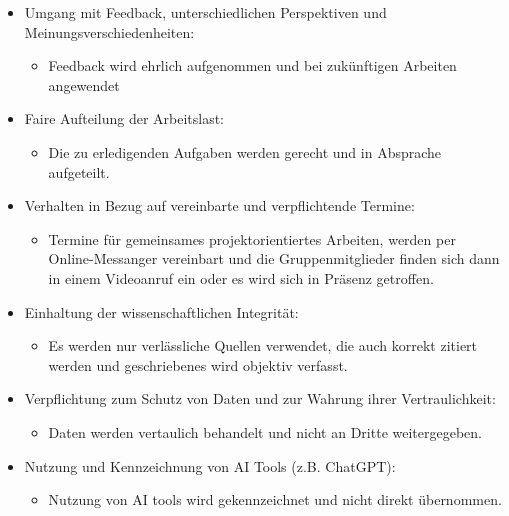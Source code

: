 \documentclass[
  12pt,
  a4paper,
]{article}
\providecommand{\tightlist}{%
  \setlength{\itemsep}{0pt}\setlength{\parskip}{0pt}}\usepackage{longtable,booktabs,array}
\begin{document}
\begin{itemize}
\item
  Umgang mit Feedback, unterschiedlichen Perspektiven und
  Meinungsverschiedenheiten:

  \begin{itemize}
  \tightlist
  \item
    Feedback wird ehrlich aufgenommen und bei zukünftigen Arbeiten
    angewendet
  \end{itemize}
\item
  Faire Aufteilung der Arbeitslast:

  \begin{itemize}
  \tightlist
  \item
    Die zu erledigenden Aufgaben werden gerecht und in Absprache
    aufgeteilt.
  \end{itemize}
\item
  Verhalten in Bezug auf vereinbarte und verpflichtende Termine:

  \begin{itemize}
  \tightlist
  \item
    Termine für gemeinsames projektorientiertes Arbeiten, werden per
    Online-Messanger vereinbart und die Gruppenmitglieder finden sich
    dann in einem Videoanruf ein oder es wird sich in Präsenz getroffen.
  \end{itemize}
\item
  Einhaltung der wissenschaftlichen Integrität:

  \begin{itemize}
  \tightlist
  \item
    Es werden nur verlässliche Quellen verwendet, die auch korrekt
    zitiert werden und geschriebenes wird objektiv verfasst.
  \end{itemize}
\item
  Verpflichtung zum Schutz von Daten und zur Wahrung ihrer
  Vertraulichkeit:

  \begin{itemize}
  \tightlist
  \item
    Daten werden vertaulich behandelt und nicht an Dritte weitergegeben.
  \end{itemize}
\item
  Nutzung und Kennzeichnung von AI Tools (z.B. ChatGPT):

  \begin{itemize}
  \tightlist
  \item
    Nutzung von AI tools wird gekennzeichnet und nicht direkt
    übernommen.
  \end{itemize}
\end{itemize}
\end{document}
